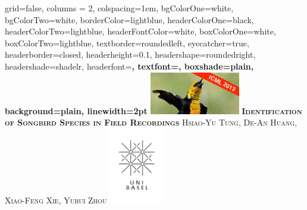 \documentclass[portrait,final,paperwidth=31truein,paperheight=38truein,fontscale=0.35, margin=1truein]{baposter}
\begin{document}



\begin{poster}%
  {
  grid=false,
  columns = 2,
  colspacing=1em,
  bgColorOne=white,
  bgColorTwo=white,
  borderColor=lightblue,
  headerColorOne=black,
  headerColorTwo=lightblue,
  headerFontColor=white,
  boxColorOne=white,
  boxColorTwo=lightblue,
  textborder=roundedleft,
  eyecatcher=true,
  headerborder=closed,
  headerheight=0.1\textheight,
  headershape=roundedright,
  headershade=shadelr,
  headerfont=\Large\bf\textsc, %
  textfont={\setlength{\parindent}{1.5em}},
  boxshade=plain,
  background=plain,
  linewidth=2pt
  }
  {\includegraphics[height=5em]{images/bird}}
  {\bf\textsc{Identification of Songbird Species in Field Recordings}\vspace{0.5em}}
  {\textsc{Hsiao-Yu Tung, De-An Huang, Xiao-Feng Xie, Yurui Zhou}}
  {%
    \includegraphics[height=9.0em]{images/logo}
  }




\end{poster}
\end{document}
